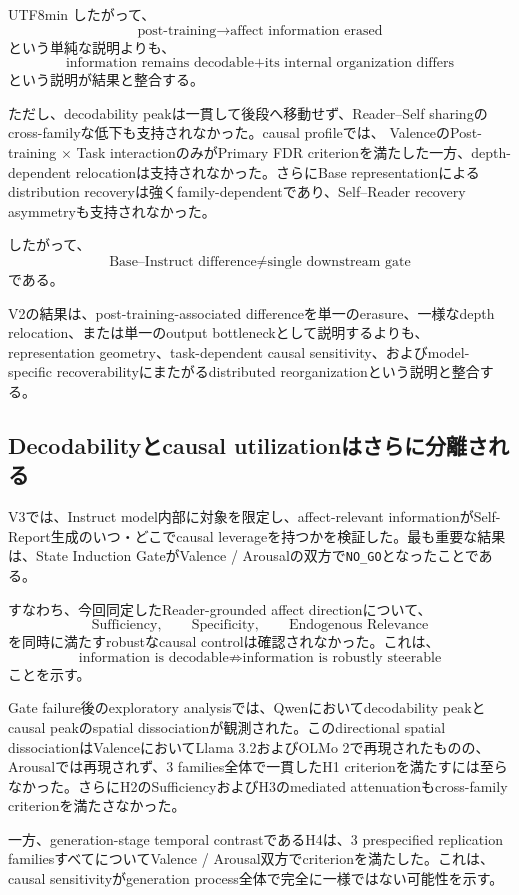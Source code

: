 \documentclass{article} %
\begin{document}
\begin{CJK*}{UTF8}{min}
したがって、
\[
\text{post-training}
\rightarrow
\text{affect information erased}
\]
という単純な説明よりも、
\[
\text{information remains decodable}
+
\text{its internal organization differs}
\]
という説明が結果と整合する。

ただし、decodability peakは一貫して後段へ移動せず、Reader--Self sharingのcross-familyな低下も支持されなかった。causal profileでは、
ValenceのPost-training $\times$ Task interactionのみがPrimary FDR criterionを満たした一方、depth-dependent relocationは支持されなかった。さらにBase representationによるdistribution recoveryは強くfamily-dependentであり、Self--Reader recovery asymmetryも支持されなかった。

したがって、
\[
\text{Base--Instruct difference}
\neq
\text{single downstream gate}
\]
である。

V2の結果は、post-training-associated differenceを単一のerasure、一様なdepth relocation、または単一のoutput bottleneckとして説明するよりも、representation geometry、task-dependent causal sensitivity、およびmodel-specific recoverabilityにまたがるdistributed reorganizationという説明と整合する。


\subsection{Decodabilityとcausal utilizationはさらに分離される}

V3では、Instruct model内部に対象を限定し、affect-relevant informationがSelf-Report生成のいつ・どこでcausal leverageを持つかを検証した。最も重要な結果は、State Induction GateがValence / Arousalの双方で\texttt{NO\_GO}となったことである。

すなわち、今回同定したReader-grounded affect directionについて、
\[
\text{Sufficiency},
\qquad
\text{Specificity},
\qquad
\text{Endogenous Relevance}
\]
を同時に満たすrobustなcausal controlは確認されなかった。これは、
\[
\text{information is decodable}
\not\Rightarrow
\text{information is robustly steerable}
\]
ことを示す。

Gate failure後のexploratory analysisでは、Qwenにおいてdecodability peakとcausal peakのspatial dissociationが観測された。このdirectional spatial dissociationはValenceにおいてLlama 3.2およびOLMo 2で再現されたものの、Arousalでは再現されず、3 families全体で一貫したH1 criterionを満たすには至らなかった。さらにH2のSufficiencyおよびH3のmediated attenuationもcross-family criterionを満たさなかった。

一方、generation-stage temporal contrastであるH4は、3 prespecified replication familiesすべてについてValence / Arousal双方でcriterionを満たした。これは、causal sensitivityがgeneration process全体で完全に一様ではない可能性を示す。


\end{CJK*}
\end{document}
